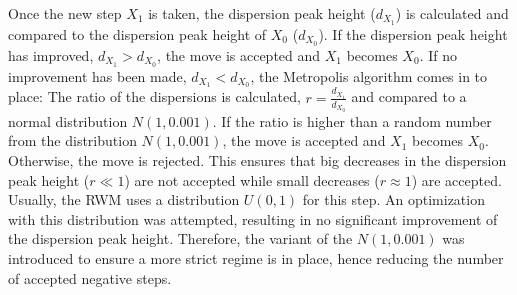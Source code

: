 Once the new step $X_{1}$ is taken, the dispersion peak height ($d_{X_{1}}$) is calculated and compared to the dispersion peak height  of $X_{0}$ ($d_{X_{0}}$). If the dispersion peak height has improved, $d_{X_{1}} > d_{X_{0}}$, the move is accepted and $X_{1}$ becomes $X_{0}$.
If no improvement has been made, $d_{X_{1}} < d_{X_{0}}$, the Metropolis algorithm comes in to place: The ratio of the dispersions is calculated, $r = \frac{d_{X_{1}}}{d_{X_{0}}}$  and compared to a normal distribution $N(1,0.001)$.
If the ratio is higher than a random number from the distribution $N(1,0.001)$, the move is accepted and $X_{1}$ becomes $X_{0}$.
Otherwise, the move is rejected.
This ensures that big decreases in the dispersion peak height ($r \ll 1$) are not accepted while small decreases ($r \approx 1$)  are accepted.
Usually, the RWM uses a distribution $U(0,1)$ for this step.
An optimization with this distribution was attempted, resulting in no significant improvement of the dispersion peak height.
Therefore, the variant of the $N(1,0.001) $ was introduced to ensure a more strict regime is in place, hence reducing the number of accepted negative steps.
